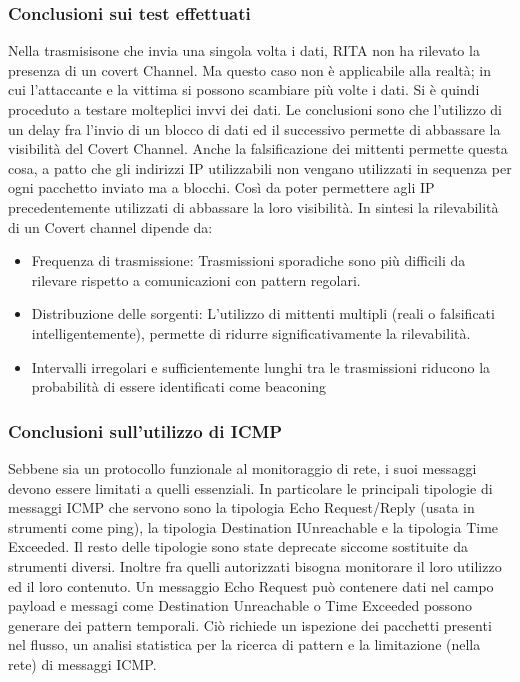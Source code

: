 \subsubsection{Conclusioni sui test effettuati}
Nella trasmisisone che invia una singola volta i dati, RITA non ha rilevato 
la presenza di un covert Channel. Ma questo caso non è applicabile alla 
realtà; in cui l'attaccante e la vittima si possono scambiare più volte 
i dati. Si è quindi proceduto a testare molteplici invvi dei dati. 
\vspace{2ex} \newline 
Le conclusioni sono che l'utilizzo di un delay fra l'invio di un blocco di 
dati ed il successivo permette di abbassare la visibilità del Covert Channel. 
Anche la falsificazione dei mittenti permette questa cosa, a patto che gli 
indirizzi IP utilizzabili non vengano utilizzati in sequenza per ogni pacchetto 
inviato ma a blocchi. Così da poter permettere agli IP precedentemente utilizzati 
di abbassare la loro visibilità. 
\vspace{1ex} \newline
In sintesi la rilevabilità di un Covert channel dipende da: 
\begin{itemize}
    \item Frequenza di trasmissione: 
    Trasmissioni sporadiche sono più difficili da rilevare rispetto a 
    comunicazioni con pattern regolari. 
    \item Distribuzione delle sorgenti: 
    L'utilizzo di mittenti multipli (reali o falsificati intelligentemente), 
    permette di ridurre significativamente la rilevabilità. 
    \item Intervalli irregolari e sufficientemente lunghi tra le 
    trasmissioni riducono la probabilità di essere identificati come 
    beaconing
\end{itemize}

\subsubsection{Conclusioni sull'utilizzo di ICMP}
Sebbene sia un protocollo funzionale al monitoraggio di rete, i suoi messaggi 
devono essere limitati a quelli essenziali. In particolare le principali 
tipologie di messaggi ICMP che servono sono la tipologia Echo Request/Reply 
(usata in strumenti come ping), la tipologia Destination IUnreachable e la 
tipologia Time Exceeded. Il resto delle tipologie sono state deprecate siccome 
sostituite da strumenti diversi. 
\vspace{1ex} \newline 
Inoltre fra quelli autorizzati bisogna monitorare il loro utilizzo ed il 
loro contenuto. Un messaggio Echo Request può contenere dati nel campo payload 
e messagi come Destination Unreachable o Time Exceeded possono generare 
dei pattern temporali. 
\vspace{2ex} \newline 
Ciò richiede un ispezione dei pacchetti presenti nel flusso, un analisi 
statistica per la ricerca di pattern e la limitazione (nella rete) di 
messaggi ICMP.  


